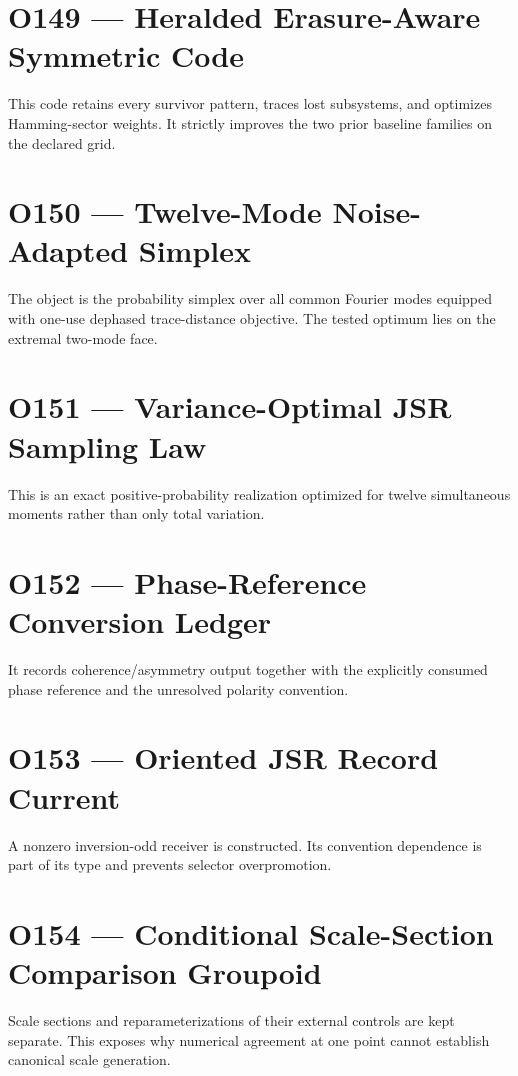 \documentclass[11pt,a4paper,openany]{report}
\begin{document}
\section{O149 --- Heralded Erasure-Aware Symmetric Code}

This code retains every survivor pattern, traces lost subsystems, and optimizes Hamming-sector weights. It strictly improves the two prior baseline families on the declared grid.

\section{O150 --- Twelve-Mode Noise-Adapted Simplex}

The object is the probability simplex over all common Fourier modes equipped with one-use dephased trace-distance objective. The tested optimum lies on the extremal two-mode face.

\section{O151 --- Variance-Optimal JSR Sampling Law}

This is an exact positive-probability realization optimized for twelve simultaneous moments rather than only total variation.

\section{O152 --- Phase-Reference Conversion Ledger}

It records coherence/\allowbreak{}asymmetry output together with the explicitly consumed phase reference and the unresolved polarity convention.

\section{O153 --- Oriented JSR Record Current}

A nonzero inversion-odd receiver is constructed. Its convention dependence is part of its type and prevents selector overpromotion.

\section{O154 --- Conditional Scale-Section Comparison Groupoid}

Scale sections and reparameterizations of their external controls are kept separate. This exposes why numerical agreement at one point cannot establish canonical scale generation.
\end{document}
